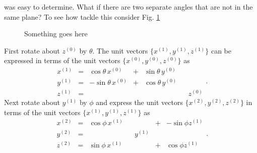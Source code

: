 \documentclass[10pt]{article}
\begin{document}
was easy to determine.  What if there are two separate angles that are not in the same plane?  To see how
tackle this consider Fig. \ref{2d_Euler}
\begin{figure}[htp]
\caption{Something goes here}\label{2d_Euler}
\end{figure}
First rotate about $z^{(0)}$ by $\theta$.  The unit vectors $\{x^{(1)},y^{(1)},z^{(1)}\}$ can be expressed
in terms of the unit vectors $\{x^{(0)},y^{(0)},z^{(0)}\}$ as
\begin{equation}
 \begin{array}{ccccccc}
 x^{(1)} & = &  \cos \theta \, x^{(0)} & + & \sin \theta \, y^{(0)} &   &   \\ 
 y^{(1)} & = & -\sin \theta \, x^{(0)} & + & \cos \theta \, y^{(0)} &   &   \\
 z^{(1)} & = &                         &   &                        &   &   z^{(0)}
 \end{array}.
\end{equation}
Next rotate about $y^{(1)}$ by $\phi$ and express the unit vectors $\{x^{(2)},y^{(2)},z^{(2)}\}$ in terms
of the unit vectors $\{x^{(1)},y^{(1)},z^{(1)}\}$ as
\begin{equation}
 \begin{array}{ccccccc}
 x^{(2)} & = &  \cos \phi \, x^{(1)} &   &                  & + & -\sin \phi z^{(1)} \\ 
 y^{(2)} & = &                       &   &          y^{(1)} &   &                   \\
 z^{(2)} & = &  \sin \phi \, x^{(1)} &   &                  & + & \cos \phi z^{(1)}
 \end{array}.
\end{equation}
\end{document}
